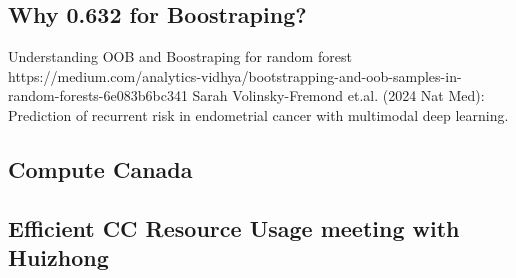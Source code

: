 \documentclass{article}%
\begin{document}
\subsection{Why 0.632 for Boostraping? }%
\label{subsec:Why0.632forBoostraping?}%

%
Understanding OOB and Boostraping for random forest %
\newline%
\newline%
%
https://medium.com/analytics{-}vidhya/bootstrapping{-}and{-}oob{-}samples{-}in{-}random{-}forests{-}6e083b6bc341%
\newline%
\newline%
%
%
\newline%
\newline%
%
%
\newline%
\newline%
%
Sarah Volinsky{-}Fremond et.al. (2024 Nat Med): Prediction of recurrent risk in endometrial cancer with multimodal deep learning. %
\newline%
\newline%
%
%
\newline%
\newline%
%
%
\newline%
\newline%
%
%
\newline%
\newline%
%
%
\newline%
\newline%
%
%
\newline%
\newline%
%
%
\newline%
\newline%
%
%
\newline%
\newline%
%
\subsection{Compute Canada }%
\label{subsec:ComputeCanada}%

%
\subsection{Efficient CC Resource Usage meeting with Huizhong}%
\label{subsec:EfficientCCResourceUsagemeetingwithHuizhong}%
\end{document}

